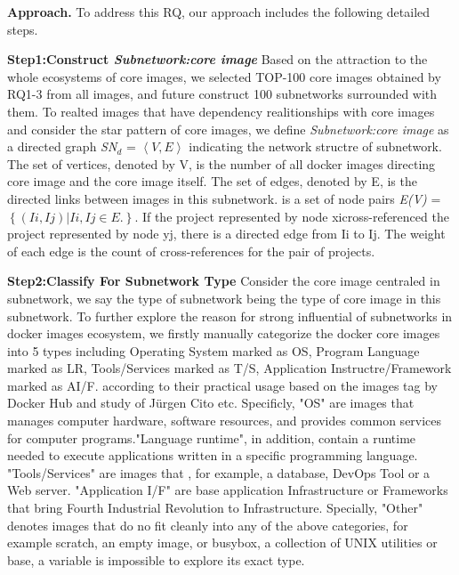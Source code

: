 \documentclass[sigconf]{acmart}
\begin{document}
\noindent\textbf{Approach. }To address this RQ, our approach includes the following detailed steps.

\noindent\textbf{Step1:Construct \emph{Subnetwork:core image }}Based on the attraction to the whole ecosystems of core images, we selected TOP-100 core images obtained by RQ1-3 from all images, and future construct 100 subnetworks surrounded with them. 
To realted images that have dependency realitionships with core images and consider the star pattern of core images, we define \emph{Subnetwork:core image} as a directed graph \emph{SN$_d$} = $\left \langle V,E \right \rangle$ indicating the network structre of subnetwork. The set of vertices, denoted by V, is the number of all docker images directing core image and the core image itself. The set of edges, denoted by E, is the directed links between images in this subnetwork. is a set of node pairs \emph{E(V)} = $\left\{ 	\left( Ii, Ij \right)|Ii,Ij \in E. \right\}$. If the project represented by node xicross-referenced the
project represented by node yj, there is a directed edge from Ii to Ij. The weight of each edge is the count of cross-references for the pair of projects. 










\noindent\textbf{Step2:Classify For Subnetwork Type}
Consider the core image centraled in subnetwork, we say the type of subnetwork being the type of core image in this subnetwork.
To further explore the reason for strong influential of subnetworks in docker images ecosystem, we firstly manually categorize the docker core images into 5 types including Operating System marked as OS, Program Language marked as LR, Tools/Services marked as T/S, Application Instructre/Framework marked as AI/F. according to their practical usage based on the images tag by Docker Hub and study of Jürgen Cito etc.
Specificly, "OS" are images that manages computer hardware, software resources, and provides common services for computer programs."Language runtime", in addition, contain a runtime needed to execute applications written in a specific programming language. "Tools/Services" are images that , for example, a database, DevOps Tool or a Web server. "Application I/F" are base application Infrastructure or Frameworks that bring Fourth Industrial Revolution to Infrastructure. Specially, "Other" denotes images that do no fit cleanly into any of the above categories, for example scratch, an empty image, or busybox, a collection of UNIX utilities or base, a variable is impossible to explore its exact type. %
\end{document}
